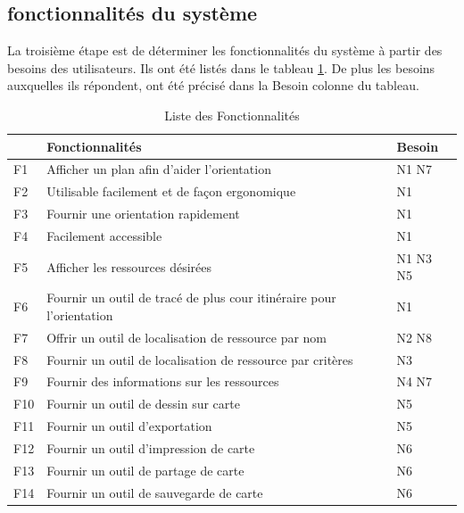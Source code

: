 \documentclass[
    iai, %
    il, %
]{heig-tb}
\begin{document}
\newpage

\subsection{fonctionnalités du système}
La troisième étape est de déterminer les fonctionnalités du système à partir des besoins des utilisateurs.
Ils ont été listés dans le tableau \ref{fonctions}.
De plus les besoins auxquelles ils répondent, ont été précisé dans la Besoin colonne du tableau.
\begin{table}[H]
    \begin{center}
        \caption{Liste des Fonctionnalités \label{fonctions}}
        \begin{tabular}{l|l|l}
                & Fonctionnalités                                                      & Besoin   \\ \hline
            F1  & Afficher un plan afin d'aider l'orientation                          & N1 N7    \\
            F2  & Utilisable facilement et de façon ergonomique                        & N1       \\
            F3  & Fournir une orientation rapidement                                   & N1       \\
            F4  & Facilement accessible                                                & N1       \\
            F5  & Afficher les ressources désirées                                     & N1 N3 N5 \\
            F6  & Fournir un outil de tracé de plus cour itinéraire pour l'orientation & N1       \\
            F7  & Offrir un outil de localisation de ressource par nom                 & N2 N8    \\
            F8  & Fournir un outil de localisation de ressource par critères           & N3       \\
            F9  & Fournir des informations sur les ressources                          & N4 N7    \\
            F10 & Fournir un outil de dessin sur carte                                 & N5       \\
            F11 & Fournir un outil d'exportation                                       & N5       \\
            F12 & Fournir un outil d'impression de carte                               & N6       \\
            F13 & Fournir un outil de partage de carte                                 & N6       \\
            F14 & Fournir un outil de sauvegarde de carte                              & N6
        \end{tabular}
    \end{center}
\end{table}
\end{document}
